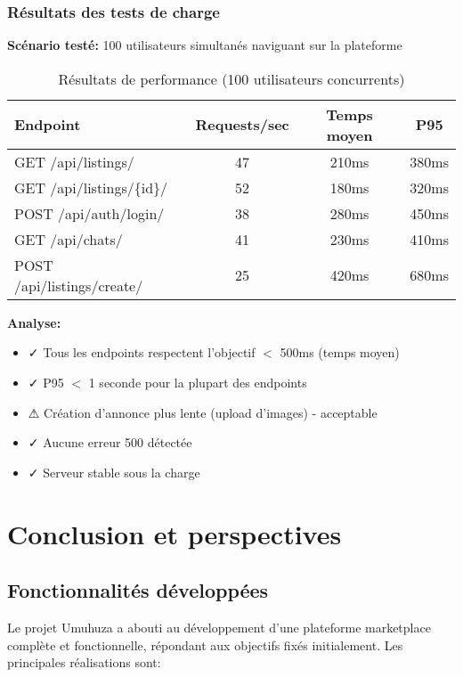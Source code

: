 \subsection{Résultats des tests de charge}

\textbf{Scénario testé:} 100 utilisateurs simultanés naviguant sur la plateforme

\begin{table}[H]
\centering
\begin{tabular}{|l|c|c|c|}
\hline
\textbf{Endpoint} & \textbf{Requests/sec} & \textbf{Temps moyen} & \textbf{P95} \\
\hline
GET /api/listings/ & 47 & 210ms & 380ms \\
GET /api/listings/\{id\}/ & 52 & 180ms & 320ms \\
POST /api/auth/login/ & 38 & 280ms & 450ms \\
GET /api/chats/ & 41 & 230ms & 410ms \\
POST /api/listings/create/ & 25 & 420ms & 680ms \\
\hline
\end{tabular}
\caption{Résultats de performance (100 utilisateurs concurrents)}
\end{table}

\textbf{Analyse:}
\begin{itemize}
    \item ✓ Tous les endpoints respectent l'objectif $<$ 500ms (temps moyen)
    \item ✓ P95 $<$ 1 seconde pour la plupart des endpoints
    \item ⚠ Création d'annonce plus lente (upload d'images) - acceptable
    \item ✓ Aucune erreur 500 détectée
    \item ✓ Serveur stable sous la charge
\end{itemize}

\chapter{Conclusion et perspectives}

\section{Fonctionnalités développées}

Le projet Umuhuza a abouti au développement d'une plateforme marketplace complète et fonctionnelle, répondant aux objectifs fixés initialement. Les principales réalisations sont:


